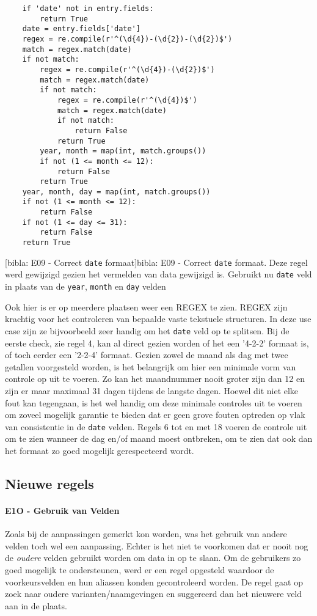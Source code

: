 \begin{verbatim}
    if 'date' not in entry.fields:
        return True
    date = entry.fields['date']
    regex = re.compile(r'^(\d{4})-(\d{2})-(\d{2})$')
    match = regex.match(date)
    if not match:
        regex = re.compile(r'^(\d{4})-(\d{2})$')
        match = regex.match(date)
        if not match:
            regex = re.compile(r'^(\d{4})$')
            match = regex.match(date)
            if not match:
                return False
            return True
        year, month = map(int, match.groups())
        if not (1 <= month <= 12):
            return False
        return True
    year, month, day = map(int, match.groups())
    if not (1 <= month <= 12):
        return False
    if not (1 <= day <= 31):
        return False
    return True
\end{verbatim}
[bibla: E09 - Correct \texttt{date} formaat]{bibla: E09 - Correct \texttt{date} formaat. Deze regel werd gewijzigd gezien het vermelden van data gewijzigd is. Gebruikt nu \texttt{date} veld in plaats van de \texttt{year}, \texttt{month} en \texttt{day} velden \label{lst:bibla_AR_E09}}

Ook hier is er op meerdere plaatsen weer een \acrfull{REGEX} te zien. \acrshort{REGEX} zijn krachtig voor het controleren van bepaalde vaste tekstuele structuren. In deze use case zijn ze bijvoorbeeld zeer handig om het \texttt{date} veld op te splitsen. Bij de eerste check, zie regel 4, kan al direct gezien worden of het een '4-2-2' formaat is, of toch eerder een '2-2-4' formaat. Gezien zowel de maand als dag met twee getallen voorgesteld worden, is het belangrijk om hier een minimale vorm van controle op uit te voeren. Zo kan het maandnummer nooit groter zijn dan 12 en zijn er maar maximaal 31 dagen tijdens de langste dagen. Hoewel dit niet elke fout kan tegengaan, is het wel handig om deze minimale controles uit te voeren om zoveel mogelijk garantie te bieden dat er geen grove fouten optreden op vlak van consistentie in de \texttt{date} velden. Regels 6 tot en met 18 voeren de controle uit om te zien wanneer de dag en/of maand moest ontbreken, om te zien dat ook dan het formaat zo goed mogelijk gerespecteerd wordt.


\subsection{Nieuwe regels}
\paragraph{E1O - Gebruik van Velden}
\label{rule:E10-field-preferences}
Zoals bij de aanpassingen gemerkt kon worden, was het gebruik van andere velden toch wel een aanpassing. Echter is het niet te voorkomen dat er nooit nog de \emph{oudere} velden gebruikt worden om data in op te slaan. Om de gebruikers zo goed mogelijk te ondersteunen, werd er een regel opgesteld waardoor de voorkeursvelden en hun aliassen konden gecontroleerd worden. De regel gaat op zoek naar oudere varianten/naamgevingen en suggereerd dan het nieuwere veld aan in de plaats. 

